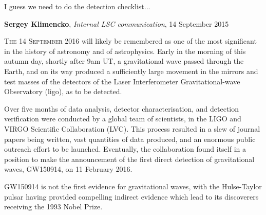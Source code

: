 
\epigraph{I guess we need to do the detection checklist...}{\textbf{Sergey Klimencko}, \emph{Internal LSC communication}, 14 September 2015}

\lettrine[lines=3]{T}{he 14 September 2016} will likely be remembered as one of the most
significant in the history of astronomy and of astrophysics. Early in
the morning of this autumn day, shortly after 9am UT, a gravitational
wave passed through the Earth, and on its way produced a sufficiently
large movement in the mirrors and test masses of the detectors of the
Laser Interferometer Gravitational-wave Observatory (\gls{ligo}), as to be
detected.

Over five months of data analysis, detector characterisation, and
detection verification were conducted by a global team of scientists,
in the LIGO and VIRGO Scientific Collaboration (LVC). This process
resulted in a slew of journal papers being written, vast quantities of
data produced, and an enormous public outreach effort to be
launched. Eventually, the collaboration found itself in a position to
make the announcement of the first direct detection of gravitational
waves, GW150914, on 11 February 2016.

GW150914 is not the first evidence for gravitational waves, with the
Hulse-Taylor pulsar\cite{1975ApJ...195L..51H,2005ASPC..328...25W}
having provided compelling indirect evidence which lead to its
discoverers receiving the 1993 Nobel Prize.

